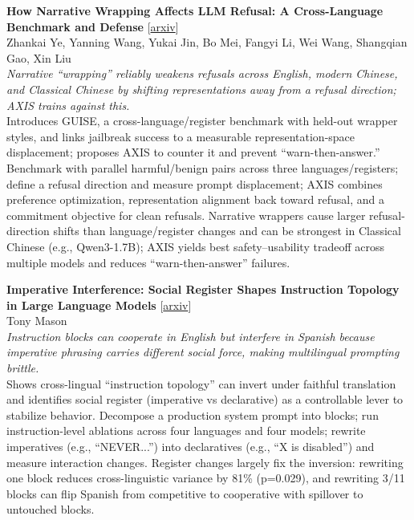 \documentclass[12pt,letterpaper]{article}
\begin{document}
\medskip

{\small\textbf{How Narrative Wrapping Affects LLM Refusal: A Cross-Language Benchmark and Defense}} {\scriptsize[\href{https://arxiv.org/abs/2610.11005}{arxiv}]}\\
{\scriptsize Zhankai Ye, Yanning Wang, Yukai Jin, Bo Mei, Fangyi Li, Wei Wang, Shangqian Gao, Xin Liu}\\

{\small\textit{Narrative ``wrapping'' reliably weakens refusals across English, modern Chinese, and Classical Chinese by shifting representations away from a refusal direction; AXIS trains against this.}}\\[1pt]
{\footnotesize Introduces GUISE, a cross-language/register benchmark with held-out wrapper styles, and links jailbreak success to a measurable representation-space displacement; proposes AXIS to counter it and prevent ``warn-then-answer.'' Benchmark with parallel harmful/benign pairs across three languages/registers; define a refusal direction and measure prompt displacement; AXIS combines preference optimization, representation alignment back toward refusal, and a commitment objective for clean refusals. Narrative wrappers cause larger refusal-direction shifts than language/register changes and can be strongest in Classical Chinese (e.g., Qwen3-1.7B); AXIS yields best safety--usability tradeoff across multiple models and reduces ``warn-then-answer'' failures.}

\medskip

{\small\textbf{Imperative Interference: Social Register Shapes Instruction Topology in Large Language Models}} {\scriptsize[\href{https://arxiv.org/abs/2603.25015}{arxiv}]}\\
{\scriptsize Tony Mason}\\

{\small\textit{Instruction blocks can cooperate in English but interfere in Spanish because imperative phrasing carries different social force, making multilingual prompting brittle.}}\\[1pt]
{\footnotesize Shows cross-lingual ``instruction topology'' can invert under faithful translation and identifies social register (imperative vs declarative) as a controllable lever to stabilize behavior. Decompose a production system prompt into blocks; run instruction-level ablations across four languages and four models; rewrite imperatives (e.g., ``NEVER...'') into declaratives (e.g., ``X is disabled'') and measure interaction changes. Register changes largely fix the inversion: rewriting one block reduces cross-linguistic variance by 81\% (p=0.029), and rewriting 3/11 blocks can flip Spanish from competitive to cooperative with spillover to untouched blocks.}
\end{document}
